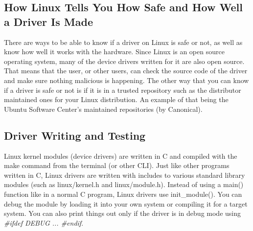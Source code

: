 \documentclass[11pt]{article}
\begin{document}
\subsection{How Linux Tells You How Safe and How Well a Driver Is Made}
There are ways to be able to know if a driver on Linux is safe or not, as well as know how well it works with the hardware. Since Linux is an open source operating system, many of the device drivers written for it are also open source. That means that the user, or other users, can check the source code of the driver and make sure nothing malicious is happening. The other way that you can know if a driver is safe or not is if it is in a trusted repository such as the distributor maintained ones for your Linux distribution. An example of that being the Ubuntu Software Center's maintained repositories (by Canonical). 

\subsection{Driver Writing and Testing}
Linux kernel modules (device drivers) are written in C and compiled with the make command from the terminal (or other CLI)\cite{lwritedriver}. Just like other programs written in C, Linux drivers are written with includes to various standard library modules (such as linux/kernel.h and linux/module.h). Instead of using a main() function like in a normal C program, Linux drivers use init\_module()\cite{lwritedriver}. You can debug the module by loading it into your own system or compiling it for a target system. You can also print things out only if the driver is in debug mode using \textit{\#ifdef DEBUG ... \#endif}.

\end{document}
